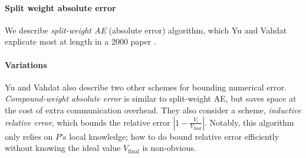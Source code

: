\documentclass[]             %
{NASA}                       %
\theoremstyle{definition}
\begin{document}
\paragraph{Split weight absolute error}
We describe \emph{split-weight AE} (absolute error) algorithm, which
Yu and Vahdat explicate most at length in a 2000 paper
\cite{2000tactalgorithms}.

\paragraph{Variations} Yu and Vahdat also describe two other schemes
for bounding numerical error. \emph{Compound-weight absolute error} is
similar to split-weight AE, but saves space at the cost of extra
communication overhead. They also consider a scheme, \emph{inductive
  relative error}, which bounds the relative error
$|1 - \frac{V_i}{V_{\textrm{final}}}|$. Notably, this algorithm only
relies on $P$'s local knowledge; how to do bound relative error
efficiently without knowing the ideal value $V_{\textrm{final}}$ is
non-obvious.
\end{document}

